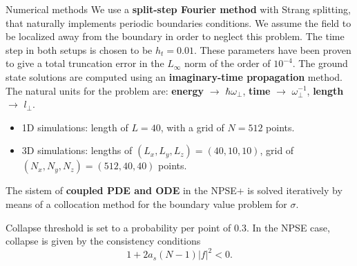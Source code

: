 \documentclass[final]{beamer}
\newlength{\colwidth}
\begin{document}
\begin{frame}[t]
\begin{columns}[t]
\begin{column}{\colwidth}
      \begin{block}{Numerical methods}
        We use a \textbf{split-step Fourier method} with Strang splitting, that naturally implements periodic boundaries conditions. We assume the field to be localized away from the boundary in order to neglect this problem. The time step in both setups is chosen to be $h_t = 0.01$. These parameters have been proven to give a total truncation error in the $L_\infty$ norm of the order of $10^{-4}$.
        The ground state solutions are computed using an \textbf{imaginary-time propagation} method. 
        The natural units for the problem are: \textbf{energy} $\longrightarrow$ $\hbar\omega_\perp$, \textbf{time}  $\rightarrow$ $\omega_\perp^{-1}$, \textbf{length} $\longrightarrow$ $l_\perp$.
        \begin{itemize}
            \item 1D simulations: length of $L = 40$, with a grid of $N = 512$ points.
            \item  3D simulations: lengths of $(L_x, L_y, L_z) = (40, 10, 10)$, grid of $(N_x, N_y, N_z) = (512, 40, 40)$ points.
        \end{itemize}
        The sistem of \textbf{coupled PDE and ODE} in the NPSE+ is solved iteratively by means of a collocation method for the boundary value problem for $\sigma$.

        Collapse threshold is set to a probability per point of $0.3$. In the NPSE case, collapse is given by the consistency conditions
        \begin{equation}
          1+2a_s(N-1)|f|^2 < 0 .
        \end{equation}
        
      \end{block}



\end{column}
\end{columns}
\end{frame}
\end{document}
